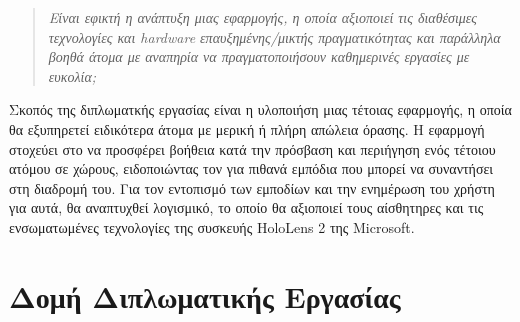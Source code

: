 \begin{quote}
    \textit{Είναι εφικτή η ανάπτυξη μιας εφαρμογής, η οποία  αξιοποιεί τις διαθέσιμες τεχνολογίες και hardware επαυξημένης/μικτής πραγματικότητας και παράλληλα βοηθά άτομα με αναπηρία να πραγματοποιήσουν καθημερινές εργασίες με ευκολία;}
\end{quote}
Σκοπός της διπλωματκής εργασίας είναι η υλοποιήση μιας τέτοιας εφαρμογής, η οποία θα εξυπηρετεί ειδικότερα άτομα με μερική ή πλήρη απώλεια όρασης. Η εφαρμογή στοχεύει στο να προσφέρει βοήθεια κατά την πρόσβαση και περιήγηση ενός τέτοιου ατόμου σε χώρους, ειδοποιώντας τον για πιθανά εμπόδια που μπορεί να συναντήσει στη διαδρομή του. Για τον εντοπισμό των εμποδίων και την ενημέρωση του χρήστη για αυτά, θα αναπτυχθεί λογισμικό, το οποίο θα αξιοποιεί τους αίσθητηρες και τις ενσωματωμένες τεχνολογίες της συσκευής HoloLens 2 της Microsoft.

\section{Δομή Διπλωματικής Εργασίας}
